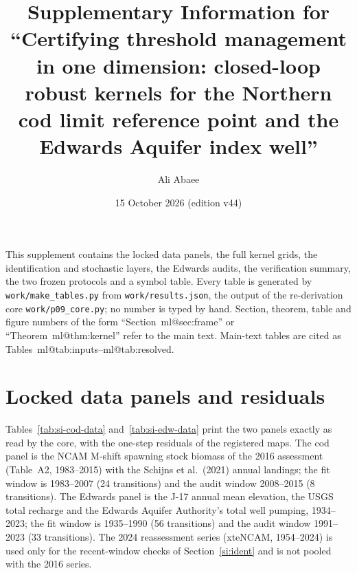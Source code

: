 \documentclass[11pt,a4paper]{article}
\title{\textbf{Supplementary Information for\\ ``Certifying threshold management in one dimension: closed-loop robust kernels for the Northern cod limit reference point and the Edwards Aquifer index well''}}
\author{Ali Abaee}
\date{15 October 2026 (edition v44)}
\makeatletter
\newcommand{\mref}[1]{\csname ml@#1\endcsname}
\makeatother
\begin{document}
\maketitle
\noindent This supplement contains the locked data panels, the full kernel grids, the identification and stochastic layers, the Edwards audits, the verification summary, the two frozen protocols and a symbol table. Every table is generated by \texttt{work/make\_tables.py} from \texttt{work/results.json}, the output of the re-derivation core \texttt{work/p09\_core.py}; no number is typed by hand. Section, theorem, table and figure numbers of the form ``Section~\mref{sec:frame}'' or ``Theorem~\mref{thm:kernel}'' refer to the main text. Main-text tables are cited as Tables~\mref{tab:inputs}--\mref{tab:resolved}.
\tableofcontents

\section{Locked data panels and residuals}\label{si:data}
Tables~\ref{tab:si-cod-data} and~\ref{tab:si-edw-data} print the two panels exactly as read by the core, with the one-step residuals of the registered maps. The cod panel is the NCAM M-shift spawning stock biomass of the 2016 assessment (Table~A2, 1983--2015) with the Schijns et al.\ (2021) annual landings; the fit window is 1983--2007 (24 transitions) and the audit window 2008--2015 (8 transitions). The Edwards panel is the J-17 annual mean elevation, the USGS total recharge and the Edwards Aquifer Authority's total well pumping, 1934--2023; the fit window is 1935--1990 (56 transitions) and the audit window 1991--2023 (33 transitions). The 2024 reassessment series (xteNCAM, 1954--2024) is used only for the recent-window checks of Section~\ref{si:ident} and is not pooled with the 2016 series.
\begingroup\footnotesize\setlength{\tabcolsep}{3pt}
\end{document}
